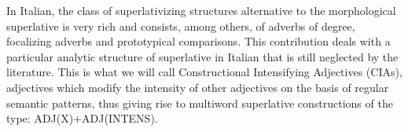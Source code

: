 In Italian, the class of superlativizing structures alternative to the morphological superlative is very rich and consists, among others, of adverbs
 of degree, focalizing adverbs and prototypical comparisons. This contribution
 deals with a particular analytic structure of superlative in Italian that is
 still neglected by the literature. This is what we will call Constructional
 Intensifying Adjectives (CIAs), adjectives which modify the intensity of other
 adjectives on the basis of regular semantic patterns, thus giving rise to
 multiword superlative constructions of the type: ADJ(X)+ADJ(INTENS).

